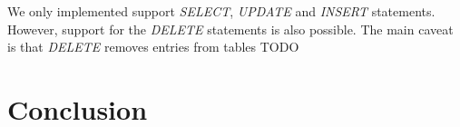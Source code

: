We only implemented support \textit{SELECT}, \textit{UPDATE} and \textit{INSERT} statements. However, support for the \textit{DELETE} statements is also possible. The main caveat is that \textit{DELETE} removes entries from tables TODO

\section{Conclusion}

